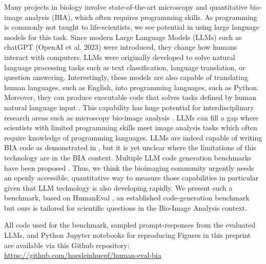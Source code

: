 \documentclass{ecai}
\begin{document}
Many projects in biology involve state-of-the-art microscopy and  quantitative bio-image analysis (BIA), which often requires programming skills. As programming is commonly not taught to life-scientists, we see potential in using large language models for this task. Since modern Large Language Models (LLMs) such as chatGPT (OpenAI et al. 2023) were introduced, they change how humans interact with computers. LLMs were originally developed to solve  natural language processing tasks such as  text classification, language translation, or question answering. Interestingly, these models  are also capable of translating human languages, such as English, into programming languages, such as Python. Moreover, they can produce executable code that solves tasks defined by human natural language input \citep{brown2020language}. This capability has huge potential for interdisciplinary research areas such as microscopy bio-image analysis \citep{Royer2023}. LLMs can fill a gap where scientists with limited programming skills meet image analysis tasks which often require knowledge of programming languages. LLMs are indeed capable of writing BIA code as demonstrated in \citep{royer2023omega}, but it is yet unclear where the limitations of this technology are in the BIA context. Multiple LLM code generation benchmarks have been proposed \citep{chen2021evaluating,austin2021,lai2022ds1000,yadav2024pythonsaga,hendrycks2021measuring}. Thus, we think the bioimaging community urgently needs an openly accessible, quantitative way to measure those capabilities in particular given that LLM technology is also developing rapidly. We present such a benchmark, based on HumanEval \citep{chen2021evaluating}, an established code-generation benchmark but ours is tailored for scientific questions in the Bio-Image Analysis context.

\begin{blind}
All code used for the benchmark, sampled prompt-responses from the evaluated LLMs, and Python Jupyter notebooks for reproducing Figures in this preprint are available via this Github repository:
   \url{https://github.com/haesleinhuepf/human-eval-bia}
\end{blind}
\end{document}
